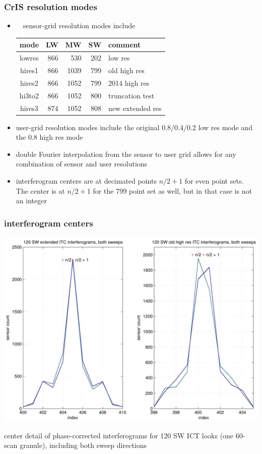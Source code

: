 \documentclass[11pt]{beamer}
\begin{document}
\begin{frame}
\frametitle{CrIS resolution modes}

\begin{itemize}

  \item \umbc\ \ccast\ sensor-grid resolution modes include

\begin{tabular}{crrrl}
   mode  &  LW  &   MW  &  SW  &  comment  \\
   \hline
  lowres &  866 &   530 &  202 &  low res  \\
  hires1 &  866 &  1039 &  799 &  old high res  \\
  hires2 &  866 &  1052 &  799 &  2014 high res  \\
  hi3to2 &  866 &  1052 &  800 &  truncation test  \\
  hires3 &  874 &  1052 &  808 &  new extended res  \\
\end{tabular}

  \item {\ccast} user-grid resolution modes include the original
    0.8/0.4/0.2 {\wnum} {\opd} low res mode and the 0.8 {\wnum}
    {\opd} high res mode

  \item double Fourier interpolation from the sensor to user grid
    allows for any combination of sensor and user resolutions

  \item interferogram centers are at decimated points $n/2 + 1$
    for even point sets.  The center is at $n/2 + 1$ for the 799
    point set as well, but in that case is not an integer

\end{itemize}

\end{frame}
\begin{frame}
\frametitle{interferogram centers}
\begin{center}
  \includegraphics[scale=0.4]{figures/igm_SW_centers.pdf}
\end{center}
center detail of phase-corrected interferograms for 120 SW ICT
looks (one 60-scan granule), including both sweep directions
\end{frame}
\end{document}
